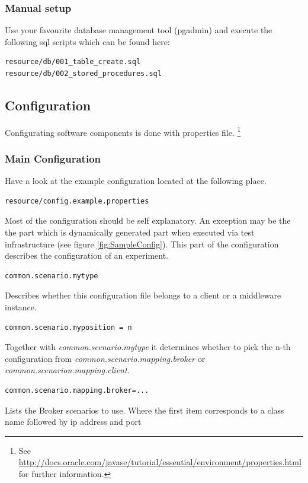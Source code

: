\documentclass[a4paper]{article}
\begin{document}
\subsubsection{Manual setup}
Use your favourite database management tool (pgadmin) and execute the following sql scripts which can be found here:

\begin{verbatim} 
resource/db/001_table_create.sql
resource/db/002_stored_procedures.sql
\end{verbatim}

\subsection{Configuration}
Configurating software components is done with properties file. \footnote{See \url{http://docs.oracle.com/javase/tutorial/essential/environment/properties.html} for further information.}
\subsubsection{Main Configuration}
\label{subsub:MainConfig}

Have a look at the example configuration located at the following place.

\begin{verbatim} 
resource/config.example.properties
\end{verbatim}

Most of the configuration should be self explanatory. An exception may be the the part which is dynamically generated part when executed via test infrastructure (see figure \ref{fig:SampleConfig}). This part of the configuration describes the configuration of an experiment.

\begin{verbatim} 
common.scenario.mytype
\end{verbatim}
Describes whether this configuration file belongs to a client or a middleware instance.

\begin{verbatim} 
common.scenario.myposition = n
\end{verbatim}
Together with \textit{common.scenario.mytype} it determines whether to pick the n-th configuration from\textit{ common.scenario.mapping.broker} or \textit{common.scenarion.mapping.client}.

\begin{verbatim} 
common.scenario.mapping.broker=...
\end{verbatim}
Lists the Broker scenarios to use. Where the first item corresponds to a class name followed by ip address and port
\end{document}
